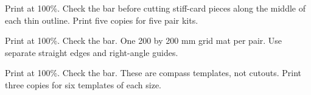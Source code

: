 \documentclass[11pt,letterpaper]{article}
\begin{document}
Print at 100\%. Check the bar before cutting stiff-card pieces along the middle of each thin outline. Print five copies for five pair kits.

\cutoutSheet
\checkBar
\newpage
Print at 100\%. Check the bar. One 200 by 200 mm grid mat per pair. Use separate straight edges and right-angle guides.

\gridMat
\vspace{3mm}
\checkBar
\newpage
Print at 100\%. Check the bar. These are compass templates, not cutouts. Print three copies for six templates of each size.

\triangleTemplates
\vspace{3mm}
\checkBar
\end{document}
